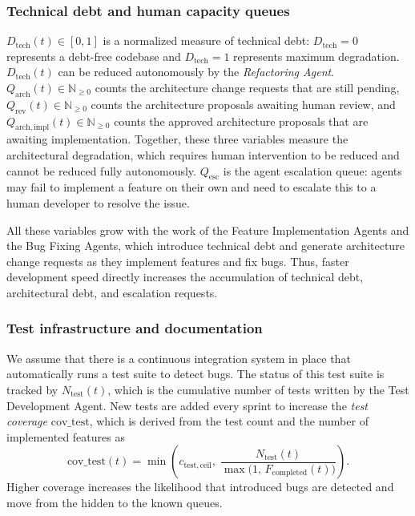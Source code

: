 \documentclass[smallextended]{svjour3}       %
\begin{document}
\subsubsection{Technical debt and human capacity queues}

$D_\mathrm{tech}(t) \in [0, 1]$ is a normalized measure of technical debt: $D_\mathrm{tech} = 0$ represents
a debt-free codebase and $D_\mathrm{tech} = 1$ represents maximum degradation. $D_\mathrm{tech}(t)$ can be reduced autonomously by the \textit{Refactoring Agent}. $Q_\mathrm{arch}(t) \in \mathbb{N}_{\geq 0}$ counts the architecture change requests that are still pending, $Q_\mathrm{rev}(t) \in \mathbb{N}_{\geq 0}$ counts the architecture proposals awaiting human review, and $Q_\mathrm{arch,impl}(t) \in \mathbb{N}_{\geq 0}$ counts the approved architecture proposals that are awaiting implementation. Together, these three variables measure the architectural degradation, which requires human intervention to be reduced and cannot be reduced fully autonomously. $Q_\mathrm{esc}$ is the agent escalation queue: agents may fail to implement a feature on their own and need to escalate this to a human developer to resolve the issue. 

All these variables grow with the work of the Feature Implementation Agents and the Bug Fixing Agents, which introduce technical debt and generate architecture change requests as they implement features and fix bugs. Thus, faster development speed directly increases the accumulation of technical debt, architectural debt, and escalation requests.

\subsubsection{Test infrastructure and documentation}

We assume that there is a continuous integration system in place that automatically runs a test suite to detect
bugs. The status of this test suite is tracked by $N_\mathrm{test}(t)$, which is the cumulative number of tests written by the Test
Development Agent. New tests are added every sprint to increase the \emph{test coverage} $\mathrm{cov\_test}$, which is derived from the test count and the number of implemented features as
\begin{equation}
  \mathrm{cov\_test}(t) = \min\!\left(c_\mathrm{test,ceil},\;
    \frac{N_\mathrm{test}(t)}{\max\!\bigl(1,\,F_\mathrm{completed}(t)\bigr)}\right).
  \label{eq:coverage}
\end{equation}
Higher coverage increases the likelihood that introduced bugs are detected and move from the hidden to the known queues. 
\end{document}
